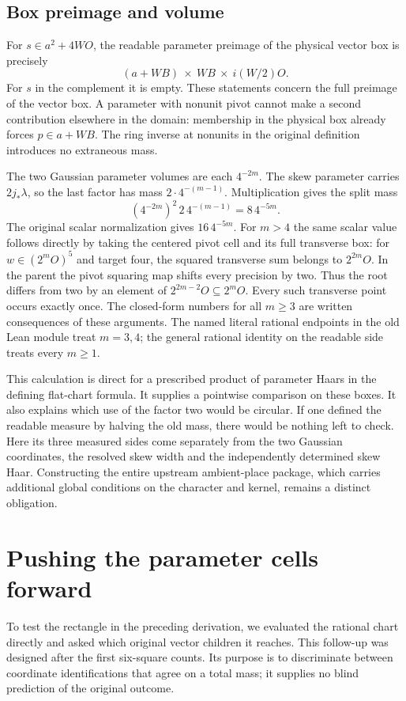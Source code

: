 \documentclass[12pt,letterpaper]{article}
\begin{document}
\subsection{Box preimage and volume}
For $s\in a^2+4WO$, the readable parameter preimage of the physical vector box is precisely
\[
    (a+WB)\ \times\ WB\ \times\ i(W/2)O .
\]
For $s$ in the complement it is empty. These statements concern the full preimage of the vector box. A parameter with nonunit pivot cannot make a second contribution elsewhere in the domain: membership in the physical box already forces $p\in a+WB$. The ring inverse at nonunits in the original definition introduces no extraneous mass.

The two Gaussian parameter volumes are each $4^{-2m}$. The skew parameter carries $2j_*\lambda$, so the last factor has mass $2\cdot4^{-(m-1)}$. Multiplication gives the split mass
\[
   (4^{-2m})^2\,2\,4^{-(m-1)}=8\,4^{-5m}.
\]
The original scalar normalization gives $16\,4^{-5m}$. For $m>4$ the same scalar value follows directly by taking the centered pivot cell and its full transverse box: for $w\in(2^mO)^5$ and target four, the squared transverse sum belongs to $2^{2m}O$. In the parent the pivot squaring map shifts every precision by two. Thus the root differs from two by an element of $2^{2m-2}O\subseteq2^mO$. Every such transverse point occurs exactly once. The closed-form numbers for all $m\ge3$ are written consequences of these arguments. The named literal rational endpoints in the old Lean module treat $m=3,4$; the general rational identity on the readable side treats every $m\ge1$.

This calculation is direct for a prescribed product of parameter Haars in the defining flat-chart formula. It supplies a pointwise comparison on these boxes. It also explains which use of the factor two would be circular. If one defined the readable measure by halving the old mass, there would be nothing left to check. Here its three measured sides come separately from the two Gaussian coordinates, the resolved skew width and the independently determined skew Haar. Constructing the entire upstream ambient-place package, which carries additional global conditions on the character and kernel, remains a distinct obligation.

\section{Pushing the parameter cells forward}
To test the rectangle in the preceding derivation, we evaluated the rational chart directly and asked which original vector children it reaches. This follow-up was designed after the first six-square counts. Its purpose is to discriminate between coordinate identifications that agree on a total mass; it supplies no blind prediction of the original outcome.
\end{document}
